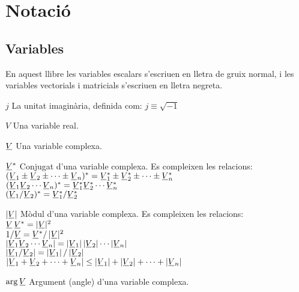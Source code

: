 \chapter*{Notació} 

\section*{Variables} 


En aquest llibre les variables escalars s'escriuen en lletra  de gruix normal, i  les variables vectorials i matricials s'escriuen
en lletra negreta.

\begin{list}{}
{\setlength{\labelwidth}{15mm} \setlength{\leftmargin}{20mm}
\setlength{\labelsep}{5mm}}
    \item[$j$] La unitat imaginària, definida com:
    $j\equiv\sqrt{-1}$
    \item[$V$] Una variable real.
    \item[$\cmplx{V}$] Una variable complexa.
    \item[$\cmplx{V}^*$] Conjugat d'una variable complexa.
    Es compleixen les relacions:\\[1ex]
     $(\cmplx{V}_1 \pm \cmplx{V}_2 \pm \cdots  \pm \cmplx{V}_n)^* = \cmplx{V}_1^* \pm
    \cmplx{V}_2^*\pm\cdots\pm\cmplx{V}_n^*$\\[1ex]
    $(\cmplx{V}_1 \cmplx{V}_2 \cdots \cmplx{V}_n)^* = \cmplx{V}_1^*  \cmplx{V}_2^*
    \cdots \cmplx{V}_n^*$\\[1ex]
    $(\cmplx{V}_1 / \cmplx{V}_2)^* = \cmplx{V}_1^* / \cmplx{V}_2^*$
    \item[$|\cmplx{V}|$] Mòdul d'una variable complexa.
    Es compleixen les relacions:\\[1ex]
      $\cmplx{V}\,\cmplx{V}^* = |\cmplx{V}|^2$\\[1ex]
      $1/ \cmplx{V} = \cmplx{V}^* / \,|\cmplx{V}|^2$\\[1ex]
      $|\cmplx{V}_1 \cmplx{V}_2 \cdots \cmplx{V}_n| =
       |\cmplx{V}_1| \,|\cmplx{V}_2| \cdots |\cmplx{V}_n|$\\[1ex]
       $|\cmplx{V}_1 / \cmplx{V}_2| = |\cmplx{V}_1| \,/ \,|\cmplx{V}_2|$\\[1ex]
      $|\cmplx{V}_1+\cmplx{V}_2+\cdots+\cmplx{V}_n| \leq
      |\cmplx{V}_1| + |\cmplx{V}_2| + \cdots  +|\cmplx{V}_n|$
    \item[$\arg\cmplx{V}$] Argument (angle) d'una variable complexa.

\end{list}

